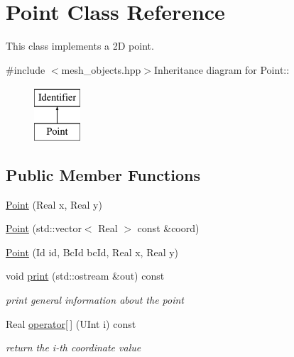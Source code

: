 \hypertarget{classPoint}{
\section{Point Class Reference}
\label{classPoint}
}


This class implements a 2D point.  


{\ttfamily \#include $<$mesh\_\-objects.hpp$>$}Inheritance diagram for Point::\begin{figure}[H]
\begin{center}
\leavevmode
\includegraphics[height=2cm]{classPoint}
\end{center}
\end{figure}
\subsection*{Public Member Functions}
\begin{DoxyCompactItemize}
\item 
\hyperlink{classPoint_a034584b85d239bdd5bd38ab80ab9aee6}{Point} (Real x, Real y)
\item 
\hyperlink{classPoint_ae0b5d58f061678fef344fffa0160ddc3}{Point} (std::vector$<$ Real $>$ const \&coord)
\item 
\hyperlink{classPoint_ac78e6a41f2d39366526d0bc0f1203efd}{Point} (Id id, BcId bcId, Real x, Real y)
\item 
\hypertarget{classPoint_a9717f7833e597160d616b0b643225c37}{
void \hyperlink{classPoint_a9717f7833e597160d616b0b643225c37}{print} (std::ostream \&out) const }
\label{classPoint_a9717f7833e597160d616b0b643225c37}

\begin{DoxyCompactList}\small\item\em print general information about the point \item\end{DoxyCompactList}\item 
\hypertarget{classPoint_a781ea96ab6bb588f2583bbaa5aefea6b}{
Real \hyperlink{classPoint_a781ea96ab6bb588f2583bbaa5aefea6b}{operator\mbox{[}$\,$\mbox{]}} (UInt i) const }
\label{classPoint_a781ea96ab6bb588f2583bbaa5aefea6b}

\begin{DoxyCompactList}\small\item\em return the i-\/th coordinate value \item\end{DoxyCompactList}\end{DoxyCompactItemize}
